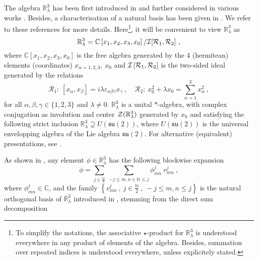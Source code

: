 \documentclass[a4paper,11pt,twoside]{article}
\numberwithin{equation}{section}
\theoremstyle{nonumberplain}
\newcounter{and}
\begin{document}
The algebra $\mathbb{R}^3_\lambda$ has been first introduced in \cite{Hammaa} and further considered in various works \cite{selene,vit-wal-12,gervitwal-13}. Besides, a characterisation of a natural basis has been given in \cite{vit-wal-12}. We refer to these references for more details. Here{\footnote{To simplify the notations, the associative $\star$-product for $\mathbb{R}^3_\lambda$ is understood everywhere in any product of elements of the algebra. Besides, summation over repeated indices is understood everywhere, unless explicitely stated.}}, it will be convenient to view $\mathbb{R}^3_\lambda$ as \cite{vit-wal-12,gervitwal-13}%
%
\begin{equation}
\mathbb{R}^3_\lambda=\mathbb{C}\left[x_1,x_2,x_3,x_0\right]/{\mathcal{I}}[{\mathcal{R}}_1,{\cal{R}}_2] \ , \label{defining} 
\end{equation}
%
where $\mathbb{C}\left[x_1,x_2,x_3,x_0\right]$ is the free algebra generated by the 4 (hermitean) elements (coordinates) $x_{\alpha=1,2,3},\ x_0$ and ${\mathcal{I}}\left[{\mathcal{R}}_1,{\cal{R}}_2\right]$ is the two-sided ideal generated by the relations%
%
\begin{equation}
{\mathcal{R}}_1: \ [x_\alpha,x_\beta] = i \lambda \varepsilon_{\alpha\beta\gamma} x_\gamma \ , \quad
{\mathcal{R}}_2: \ x_0^2 + \lambda x_0 = \sum_{\alpha=1}^3 x_\alpha^2 \ , \label{relat1}
\end{equation}
%
for all $\alpha,\beta,\gamma \in \{1,2,3\}$ and $\lambda\ne0$. $\mathbb{R}^3_\lambda$ is a unital $*$-algebra, with complex conjugation as involution and center ${\cal{Z}}(\mathbb{R}^3_\lambda)$ generated by $x_0$ and satisfying the following strict inclusion $\mathbb{R}^3_\lambda\supsetneq U(\mathfrak{su}(2))$, where $U(\mathfrak{su}(2))$ is the universal envelopping algebra of the Lie algebra ${\mathfrak{su}}(2)$. For alternative (equivalent) presentations, see \cite{selene, vit-wal-12, gervitwal-13}.\par%
%
As shown in \cite{vit-wal-12}, any element $\phi\in\mathbb{R}^3_\lambda$ has the following blockwise expansion%
%
\begin{equation}
\phi = \sum_{j\in\frac{\mathbb{N}}{2}} \ \sum_{-j\le m,n\in\mathbb{N}\le j} \phi^j_{mn} \ v^j_{mn} \ , \label{nat-fourier}
\end{equation}
%
where $\phi^j_{mn}\in\mathbb{C}$, and the family $\left\{v^j_{mn} \ , \ j\in\frac{\mathbb{N}}{2} \ ,\ -j\le m,n\le j \right\}$ is the natural orthogonal basis of $\mathbb{R}^3_\lambda$ introduced in \cite{vit-wal-12}, stemming from the direct sum decomposition%
\end{document}
